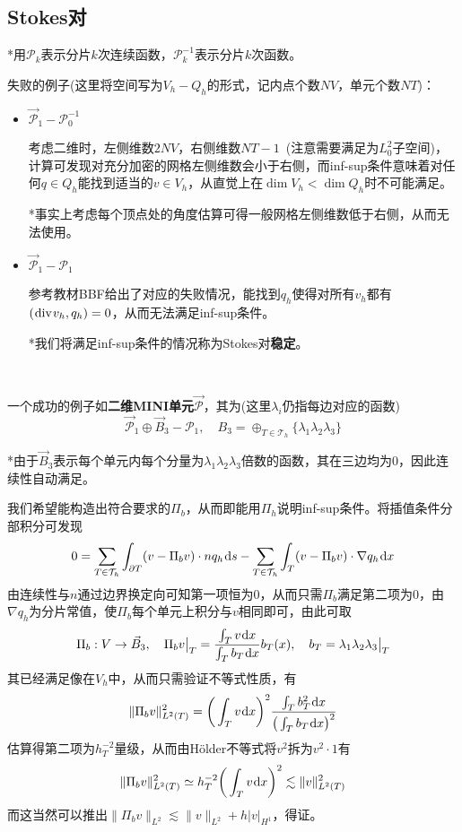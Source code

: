 \documentclass[a4paper,UTF8,fontset=windows]{ctexart}
\newcommand*{\dr}{\hspace{0.07em}\mathrm{d}}
\newcommand*{\cp}{\mathcal{P}}
\newcommand*{\ct}{\mathcal{T}}
\renewcommand*{\div}{\hspace{0.07em}\mathrm{div}\hspace{0.07em}}
\begin{document}
\subsection{Stokes对}
*用$\cp_k$表示分片$k$次连续函数，$\cp_k^{-1}$表示分片$k$次函数。

失败的例子(这里将空间写为$V_h-Q_h$的形式，记内点个数$NV$，单元个数$NT$)：
\begin{itemize}
    \item $\vec{\cp}_1-\cp_0^{-1}$
    
    考虑二维时，左侧维数$2NV$，右侧维数$NT-1$\ (注意需要满足为$L_0^2$子空间)，计算可发现对充分加密的网格左侧维数会小于右侧，而inf-sup条件意味着对任何$q\in Q_h$能找到适当的$v\in V_h$，从直觉上在$\dim V_h<\dim Q_h$时不可能满足。

    *事实上考虑每个顶点处的角度估算可得一般网格左侧维数低于右侧，从而无法使用。

    \item $\vec{\cp}_1-\cp_1$
    
    参考教材BBF给出了对应的失败情况，能找到$q_h$使得对所有$v_h$都有$(\div v_h,q_h)=0$，从而无法满足inf-sup条件。

    *我们将满足inf-sup条件的情况称为Stokes对\textbf{稳定}。
\end{itemize}

\

一个成功的例子如\textbf{二维MINI单元}$\vec{\cp}$，其为(这里$\lambda_i$仍指每边对应的函数)
$$\vec{\cp}_1\oplus\vec{B}_3-\cp_1,\quad B_3=\oplus_{T\in\ct_h}\{\lambda_1\lambda_2\lambda_3\}$$

*由于$\vec{B}_3$表示每个单元内每个分量为$\lambda_1\lambda_2\lambda_3$倍数的函数，其在三边均为0，因此连续性自动满足。

我们希望能构造出符合要求的$\Pi_b$，从而即能用$\Pi_h$说明inf-sup条件。将插值条件分部积分可发现
$$0=\sum_{T\in\ct_h}\int_{\partial T}(v-\Pi_bv)\cdot nq_h\dr s-\sum_{T\in\ct_h}\int_T(v-\Pi_bv)\cdot\nabla q_h\dr x$$
由连续性与$n$通过边界换定向可知第一项恒为0，从而只需$\Pi_b$满足第二项为0，由$\nabla q_h$为分片常值，使$\Pi_b$每个单元上积分与$v$相同即可，由此可取
$$\Pi_b:V\to\vec{B}_3,\quad\Pi_bv\big|_T=\frac{\int_Tv\dr x}{\int_Tb_T\dr x}b_T(x),\quad b_T=\lambda_1\lambda_2\lambda_3\big|_T$$
其已经满足像在$V_h$中，从而只需验证不等式性质，有
$$\|\Pi_bv\|_{L^2(T)}^2=\bigg(\int_Tv\dr x\bigg)^2\frac{\int_Tb_T^2\dr x}{\big(\int_Tb_T\dr x\big)^2}$$
估算得第二项为$h_T^{-2}$量级，从而由H\"older不等式将$v^2$拆为$v^2\cdot1$有
$$\|\Pi_bv\|_{L^2(T)}^2\simeq h_T^{-2}\bigg(\int_Tv\dr x\bigg)^2\lesssim\|v\|_{L^2(T)}^2$$
而这当然可以推出$\|\Pi_bv\|_{L^2}\lesssim\|v\|_{L^2}+h|v|_{H^1}$，得证。
\end{document}
